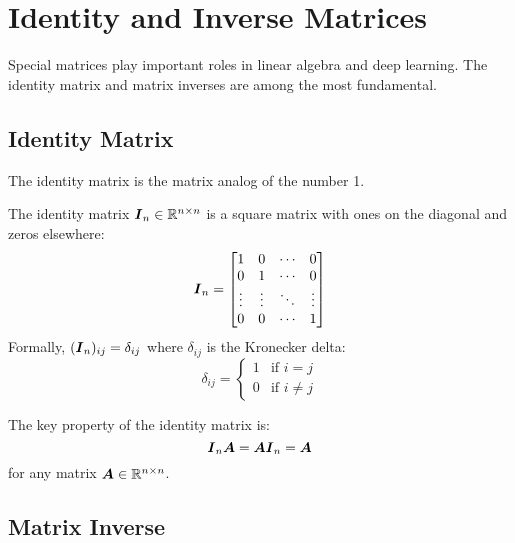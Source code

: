 
\section{Identity and Inverse Matrices}
\label{sec:identity-inverse}

Special matrices play important roles in linear algebra and deep learning. The identity matrix and matrix inverses are among the most fundamental.

\subsection{Identity Matrix}

The identity matrix is the matrix analog of the number 1.

\begin{definition}
The identity matrix $\boldsymbol{I}_n \in \mathbb{R}^{n \times n}$ is a square matrix with ones on the diagonal and zeros elsewhere:
\begin{equation}
    \boldsymbol{I}_n = \begin{bmatrix}
        1 & 0 & \cdots & 0 \\
        0 & 1 & \cdots & 0 \\
        \vdots & \vdots & \ddots & \vdots \\
        0 & 0 & \cdots & 1
    \end{bmatrix}
\end{equation}
Formally, $(\boldsymbol{I}_n)_{ij} = \delta_{ij}$ where $\delta_{ij}$ is the Kronecker delta:
\begin{equation}
    \delta_{ij} = \begin{cases}
        1 & \text{if } i = j \\
        0 & \text{if } i \neq j
    \end{cases}
\end{equation}
\end{definition}

The key property of the identity matrix is:
\begin{equation}
    \boldsymbol{I}_n\boldsymbol{A} = \boldsymbol{A}\boldsymbol{I}_n = \boldsymbol{A}
\end{equation}
for any matrix $\boldsymbol{A} \in \mathbb{R}^{n \times n}$.

\subsection{Matrix Inverse}


